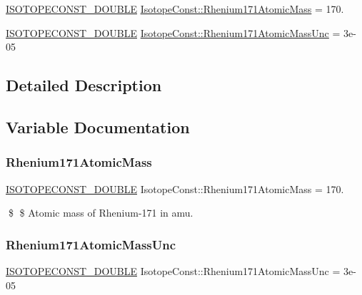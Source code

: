 \begin{DoxyCompactItemize}
\item 
\mbox{\hyperlink{group___isotope_const-_macros_ga8f45a7272ce02c0b4c65c44636ed719a}{I\+S\+O\+T\+O\+P\+E\+C\+O\+N\+S\+T\+\_\+\+D\+O\+U\+B\+LE}} \mbox{\hyperlink{group___isotope_const-_rhenium-_re171_ga1d4cbef86a98a68afe02a8848f3b40fe}{Isotope\+Const\+::\+Rhenium171\+Atomic\+Mass}} = 170.
\item 
\mbox{\hyperlink{group___isotope_const-_macros_ga8f45a7272ce02c0b4c65c44636ed719a}{I\+S\+O\+T\+O\+P\+E\+C\+O\+N\+S\+T\+\_\+\+D\+O\+U\+B\+LE}} \mbox{\hyperlink{group___isotope_const-_rhenium-_re171_gacd2eb803b6d1b25c7b2f0c314baf3438}{Isotope\+Const\+::\+Rhenium171\+Atomic\+Mass\+Unc}} = 3e-\/05
\end{DoxyCompactItemize}


\subsection{Detailed Description}


\subsection{Variable Documentation}
\mbox{\label{group___isotope_const-_rhenium-_re171_ga1d4cbef86a98a68afe02a8848f3b40fe}} 
\subsubsection{\texorpdfstring{Rhenium171\+Atomic\+Mass}{Rhenium171AtomicMass}}
{\footnotesize\ttfamily \mbox{\hyperlink{group___isotope_const-_macros_ga8f45a7272ce02c0b4c65c44636ed719a}{I\+S\+O\+T\+O\+P\+E\+C\+O\+N\+S\+T\+\_\+\+D\+O\+U\+B\+LE}} Isotope\+Const\+::\+Rhenium171\+Atomic\+Mass = 170.}

\$ \$ Atomic mass of Rhenium-\/171 in amu. \mbox{\label{group___isotope_const-_rhenium-_re171_gacd2eb803b6d1b25c7b2f0c314baf3438}} 
\subsubsection{\texorpdfstring{Rhenium171\+Atomic\+Mass\+Unc}{Rhenium171AtomicMassUnc}}
{\footnotesize\ttfamily \mbox{\hyperlink{group___isotope_const-_macros_ga8f45a7272ce02c0b4c65c44636ed719a}{I\+S\+O\+T\+O\+P\+E\+C\+O\+N\+S\+T\+\_\+\+D\+O\+U\+B\+LE}} Isotope\+Const\+::\+Rhenium171\+Atomic\+Mass\+Unc = 3e-\/05}

